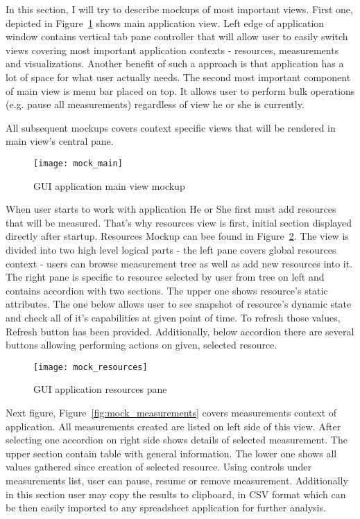 In this section, I will try to describe mockups of most important views. First one, depicted in Figure~\ref{fig:mock_main} shows main application view. Left edge of application window contains vertical tab pane controller that will allow user to easily switch views covering most important application contexts - resources, measurements and visualizations. Another benefit of such a approach is that application has a lot of space for what user actually needs. The second most important component of main view is menu bar placed on top. It allows user to perform bulk operations (e.g. pause all measurements) regardless of view he or she is currently. 

All subsequent mockups covers context specific views that will be rendered in main view's central pane.

\begin{figure}[ht]
  \centering
  \texttt{[image: mock\_main]}
  \caption{GUI application main view mockup}
  \label{fig:mock_main}
\end{figure}

When user starts to work with application He or She first must add resources that will be measured. That's why resources view is first, initial section displayed directly after startup. Resources Mockup can bee found in Figure~\ref{fig:mock_resources}. The view is divided into two high level logical parts - the left pane covers global
resources context - users can browse measurement tree as well as add new resources into it. The right pane is specific
to resource selected by user from tree on left and contains accordion with two sections. The upper one shows resource's static
attributes. The one below allows user to see snapshot of resource's dynamic state and check all of it's capabilities at
given point of time. To refresh those values, Refresh button has been provided. Additionally, below accordion there are
several buttons allowing performing actions on given, selected resource.

\begin{figure}[ht]
  \centering
  \texttt{[image: mock\_resources]}
  \caption{GUI application resources pane}
  \label{fig:mock_resources}
\end{figure}

Next figure, Figure~\ref{fig:mock_measurements} covers measurements context of application. All measurements created
are listed on left side of this view. After selecting one accordion on right side shows details of selected
measurement. The upper section contain table with general information. The lower one shows all values gathered since creation of selected resource. Using controls under measurements list, user can
pause, resume or remove measurement. Additionally in this section user may copy the results to clipboard, in CSV format which can be then easily imported to any spreadsheet application for further analysis. 

